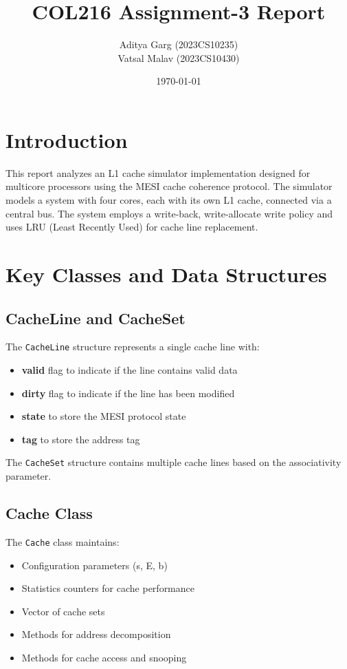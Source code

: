 \documentclass[a4paper,12pt]{article}
\title{COL216 Assignment-3 Report}
\author{
    Aditya Garg (2023CS10235) \\
    Vatsal Malav (2023CS10430)  
}
\date{\today}
\begin{document}
\maketitle

\section{Introduction}
This report analyzes an L1 cache simulator implementation designed for multicore processors using the MESI cache coherence protocol. The simulator models a system with four cores, each with its own L1 cache, connected via a central bus. The system employs a write-back, write-allocate write policy and uses LRU (Least Recently Used) for cache line replacement.
\section{Key Classes and Data Structures}
\subsection{CacheLine and CacheSet}
The \texttt{CacheLine} structure represents a single cache line with:
\begin{itemize}
 \vspace{-0.4mm}
    \item \textbf{valid} flag to indicate if the line contains valid data
    \vspace{-3mm}
\item \textbf{dirty} flag to indicate if the line has been modified
 \vspace{-3mm}
\item \textbf{state} to store the MESI protocol state
 \vspace{-3mm}
\item \textbf{tag} to store the address tag
\end{itemize}
The \texttt{CacheSet} structure contains multiple cache lines based on the associativity parameter.
\vspace{-3mm}
\subsection{Cache Class}
The \texttt{Cache} class maintains:
\begin{itemize}
\vspace{-0.5mm}
    \item Configuration parameters (s, E, b)
    \vspace{-3mm}
\item Statistics counters for cache performance
\vspace{-3mm}
\item Vector of cache sets
\vspace{-3mm}
\item Methods for address decomposition
\vspace{-3mm}
\item Methods for cache access and snooping
\vspace{-3mm}
\end{itemize}
\end{document}

